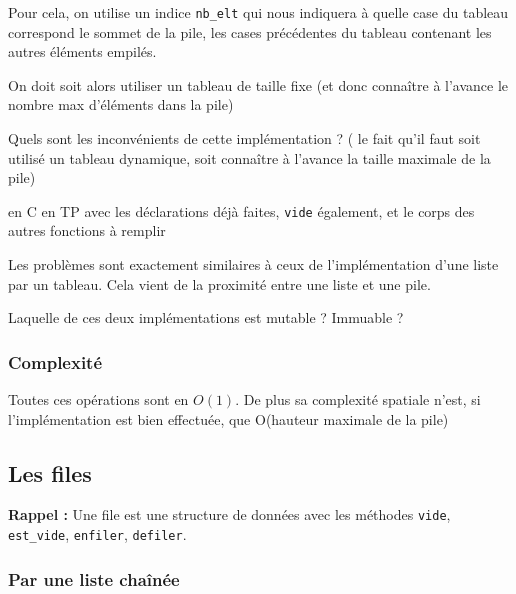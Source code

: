 \begin{idee}
	Pour cela, on utilise un indice \texttt{nb\_elt} qui nous indiquera à quelle case du tableau correspond le sommet de la pile, les cases précédentes du tableau contenant les autres éléments empilés.
\end{idee}


\begin{impl}
	On doit soit alors utiliser un tableau de taille fixe (et donc connaître à l'avance le nombre max d'éléments dans la pile)
\end{impl}


\begin{exercise}
	Quels sont les inconvénients de cette implémentation ? ( le fait qu'il faut soit utilisé un tableau dynamique, soit connaître à l'avance la taille maximale de la pile)
\end{exercise}

\begin{impl}
	en C en TP avec les déclarations déjà faites, \texttt{vide} également, et le corps des autres fonctions à remplir
\end{impl}


\begin{rem}
	Les problèmes sont exactement similaires à ceux de l'implémentation d'une liste par un tableau. Cela vient de la proximité entre une liste et une pile.
\end{rem}

\begin{exercise}
	Laquelle de ces deux implémentations est mutable ? Immuable ?
\end{exercise}

\subsubsection{Complexité}

Toutes ces opérations sont en $O(1)$. De plus sa complexité spatiale n'est, si l'implémentation est bien effectuée, que O(hauteur maximale de la pile)

\subsection{Les files}

\textbf{Rappel :} Une file est une structure de données avec les méthodes \texttt{vide}, \texttt{est\_vide}, \texttt{enfiler}, \texttt{defiler}.

\subsubsection{Par une liste chaînée}

